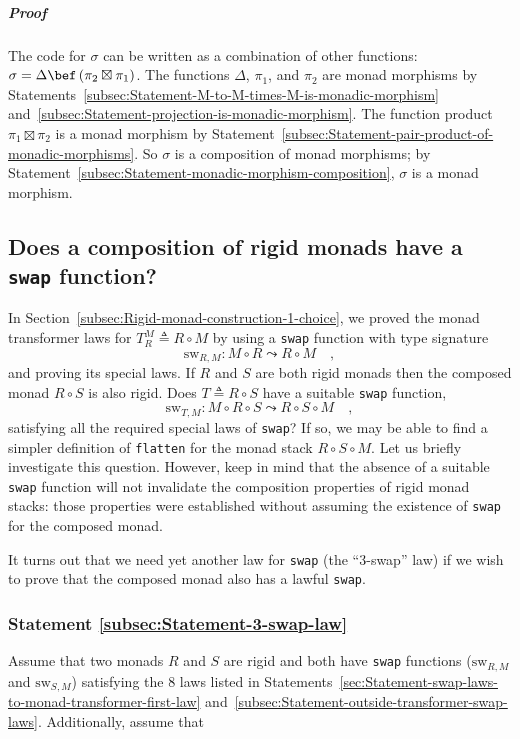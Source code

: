 \subparagraph{Proof}

The code for $\sigma$ can be written as a combination of other functions:
$\sigma=\Delta\bef\left(\pi_{2}\boxtimes\pi_{1}\right)$. The functions
$\Delta$, $\pi_{1}$, and $\pi_{2}$ are monad morphisms by Statements~\ref{subsec:Statement-M-to-M-times-M-is-monadic-morphism}
and~\ref{subsec:Statement-projection-is-monadic-morphism}. The function
product $\pi_{1}\boxtimes\pi_{2}$ is a monad morphism by Statement~\ref{subsec:Statement-pair-product-of-monadic-morphisms}.
So $\sigma$ is a composition of monad morphisms; by Statement~\ref{subsec:Statement-monadic-morphism-composition},
$\sigma$ is a monad morphism.

\subsection{Does a composition of rigid monads have a \texttt{swap} function?\label{subsec:Does-a-composition-have-swap}}

In Section~\ref{subsec:Rigid-monad-construction-1-choice}, we proved
the monad transformer laws for $T_{R}^{M}\triangleq R\circ M$ by
using a \lstinline!swap! function with type signature
\[
\text{sw}_{R,M}:M\circ R\leadsto R\circ M\quad,
\]
and proving its special laws. If $R$ and $S$ are both rigid monads
then the composed monad $R\circ S$ is also rigid. Does $T\triangleq R\circ S$
have a suitable \lstinline!swap! function,
\[
\text{sw}_{T,M}:M\circ R\circ S\leadsto R\circ S\circ M\quad,
\]
satisfying all the required special laws of \lstinline!swap!? If
so, we may be able to find a simpler definition of \lstinline!flatten!
for the monad stack $R\circ S\circ M$. Let us briefly investigate
this question. However, keep in mind that the absence of a suitable
\lstinline!swap! function will not invalidate the composition properties
of rigid monad stacks: those properties were established without assuming
the existence of \lstinline!swap! for the composed monad.

It turns out that we need yet another law for \lstinline!swap! (the
\textsf{``}3-swap\textsf{''} law) if we wish to prove that the composed monad also
has a lawful \lstinline!swap!. 

\subsubsection{Statement \label{subsec:Statement-3-swap-law}\ref{subsec:Statement-3-swap-law}}

Assume that two monads $R$ and $S$ are rigid and both have \lstinline!swap!
functions ($\text{sw}_{R,M}$ and $\text{sw}_{S,M}$) satisfying the
$8$ laws listed in Statements~\ref{sec:Statement-swap-laws-to-monad-transformer-first-law}
and~\ref{subsec:Statement-outside-transformer-swap-laws}. Additionally,
assume that%
\begin{comment}
precarious formatting
\end{comment}

